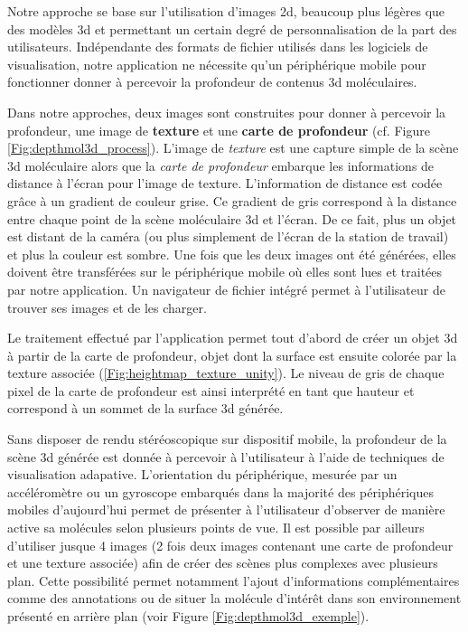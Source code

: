 Notre approche se base sur l'utilisation d'images 2d, beaucoup plus légères que des modèles 3d et permettant un certain degré de personnalisation de la part des utilisateurs. Indépendante des formats de fichier utilisés dans les logiciels de visualisation, notre application ne nécessite qu'un périphérique mobile pour fonctionner donner à percevoir la profondeur de contenus 3d moléculaires. %

Dans notre approches, deux images sont construites pour donner à percevoir la profondeur, une image de \textbf{texture} et une \textbf{carte de profondeur} (cf. Figure \ref{Fig:depthmol3d_process}). L'image de \textit{texture} est une capture simple de la scène 3d moléculaire alors que la \textit{carte de profondeur} embarque les informations de distance à l'écran pour l'image de texture. L'information de distance est codée grâce à un gradient de couleur grise. Ce gradient de gris correspond à la distance entre chaque point de la scène moléculaire 3d et l'écran. De ce fait, plus un objet est distant de la caméra (ou plus simplement de l'écran de la station de travail) et plus la couleur est sombre. Une fois que les deux images ont été générées, elles doivent être transférées sur le périphérique mobile où elles sont lues et traitées par notre application. Un navigateur de fichier intégré permet à l'utilisateur de trouver ses images et de les charger. 

Le traitement effectué par l'application permet tout d'abord de créer un objet 3d à partir de la carte de profondeur, objet dont la surface est ensuite colorée par la texture associée (\ref{Fig:heightmap_texture_unity}). Le niveau de gris de chaque pixel de la carte de profondeur est ainsi interprété en tant que hauteur et correspond à un sommet de la surface 3d générée. %

Sans disposer de rendu stéréoscopique sur dispositif mobile, la profondeur de la scène 3d générée est donnée à percevoir à l'utilisateur à l'aide de techniques de visualisation adapative.  L'orientation du périphérique, mesurée par un accéléromètre ou un gyroscope embarqués dans la majorité des périphériques mobiles d'aujourd'hui permet de présenter à l'utilisateur d'observer de manière active sa molécules selon plusieurs points de vue. Il est possible par ailleurs d'utiliser jusque 4 images (2 fois deux images contenant une carte de profondeur et une texture associée) afin de créer des scènes plus complexes avec plusieurs plan. Cette possibilité permet notamment l'ajout d'informations complémentaires comme des annotations ou de situer la molécule d'intérêt dans son environnement présenté en arrière plan (voir Figure \ref{Fig:depthmol3d_exemple}).

